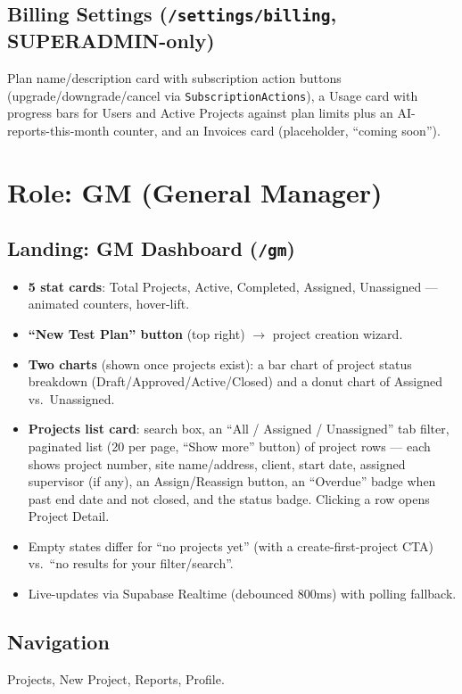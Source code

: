 \documentclass[11pt]{article}
\begin{document}
\subsection{Billing Settings (\texttt{/settings/billing}, SUPERADMIN-only)}
Plan name/description card with subscription action buttons (upgrade/downgrade/cancel via
\texttt{SubscriptionActions}), a Usage card with progress bars for Users and Active Projects
against plan limits plus an AI-reports-this-month counter, and an Invoices card (placeholder,
``coming soon'').

\section{Role: GM (General Manager)}

\subsection{Landing: GM Dashboard (\texttt{/gm})}
\begin{itemize}[nosep]
  \item \textbf{5 stat cards}: Total Projects, Active, Completed, Assigned, Unassigned --- animated
    counters, hover-lift.
  \item \textbf{``New Test Plan'' button} (top right) $\to$ project creation wizard.
  \item \textbf{Two charts} (shown once projects exist): a bar chart of project status breakdown
    (Draft/Approved/Active/Closed) and a donut chart of Assigned vs.\ Unassigned.
  \item \textbf{Projects list card}: search box, an ``All / Assigned / Unassigned'' tab filter,
    paginated list (20 per page, ``Show more'' button) of project rows --- each shows project
    number, site name/address, client, start date, assigned supervisor (if any), an
    Assign/Reassign button, an ``Overdue'' badge when past end date and not closed, and the status
    badge. Clicking a row opens Project Detail.
  \item Empty states differ for ``no projects yet'' (with a create-first-project CTA) vs.\ ``no
    results for your filter/search''.
  \item Live-updates via Supabase Realtime (debounced 800ms) with polling fallback.
\end{itemize}

\subsection{Navigation}
Projects, New Project, Reports, Profile.
\end{document}
